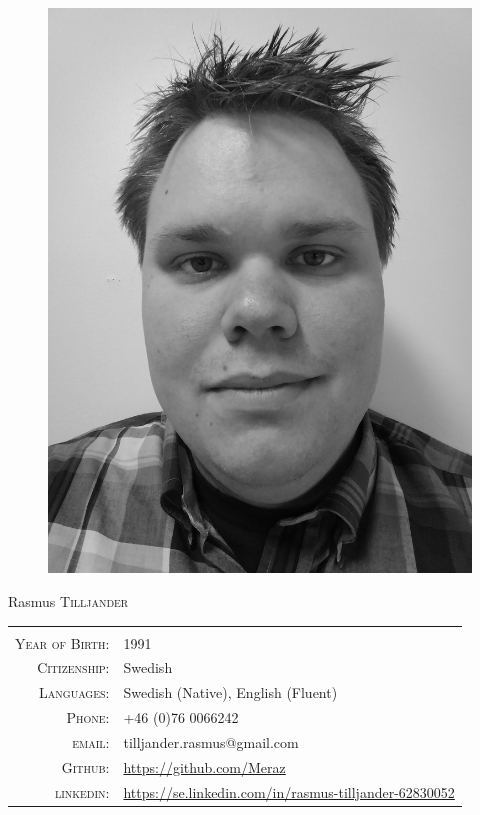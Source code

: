 \documentclass[a4paper,10pt]{article}
\begin{document}
\pagestyle{empty} %

\par{	
    \begin{figure}
    \includegraphics[scale=0.10]{rt050.png}
    \end{figure}
    
    \Huge Rasmus \textsc{Tilljander}
    
\par}


\begin{tabular}{rl}
    \textsc{} &    \\
    \textsc{Year of Birth:} &   1991   \\
    \textsc{Citizenship:}   &   Swedish \\ 
    \textsc{Languages:}  & Swedish (Native), English (Fluent) \\
    \textsc{Phone:}     & +46 (0)76 0066242\\
    \textsc{email:}     & tilljander.rasmus@gmail.com\\
    \textsc{Github:}  & \url{https://github.com/Meraz}\\
    \textsc{linkedin:}  & \url{https://se.linkedin.com/in/rasmus-tilljander-62830052}
\end{tabular}
\end{document}
